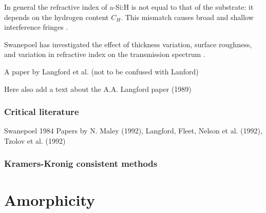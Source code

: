 	In general the refractive index of a-Si:H is not equal to that of the substrate: it depends on the hydrogen content $C_H$. This mismatch causes broad and shallow interference fringes \cite{Langford1992}.

Swanepoel has investigated the effect of thickness variation, surface roughness, and variation in refractive index on the transmission spectrum \cite{Swanepoel1984}.



A paper by Langford et al. (not to be confused with Lanford) 

Here also add a text about the A.A. Langford paper (1989) 

\subsubsection{Critical literature}
Swanepoel 1984
Papers by N. Maley (1992), Langford, Fleet, Nelson et al. (1992), Tzolov et al. (1992)
\subsubsection{Kramers-Kronig consistent methods}
\section{Amorphicity}
\Blindtext[2][1]
